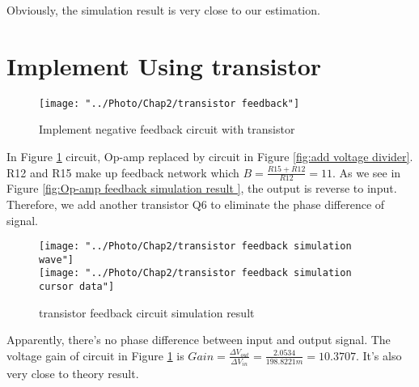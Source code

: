 Obviously, the simulation result is very close to our estimation.


\section{Implement Using transistor}


\begin{figure}[htbp]
\centering
\texttt{[image: "../Photo/Chap2/transistor feedback"]}
\caption{Implement negative feedback circuit with transistor}
\label{fig:transistorfeedback}
\end{figure}

In Figure \ref{fig:transistorfeedback} circuit, Op-amp replaced by circuit in Figure \ref{fig:add voltage divider}. R12 and R15 make up feedback network which $ B = \frac{R15+R12}{R12} = 11 $. As we see in Figure \ref{fig:Op-amp  feedback simulation result }, the output is reverse to input. Therefore, we add another transistor Q6 to eliminate the phase difference of signal.


\begin{figure}[htbp]
\centering
\texttt{[image: "../Photo/Chap2/transistor feedback simulation wave"]}\\[0.5cm]
\texttt{[image: "../Photo/Chap2/transistor feedback simulation cursor data"]}
\caption{transistor feedback circuit simulation result}
\label{fig:transistorfeedbacksimulationwave}
\end{figure}

Apparently, there's no phase difference between input and output signal. 
The voltage gain of circuit in Figure \ref{fig:transistorfeedback} is $ Gain = \frac{\Delta V_{out}}{\Delta V_{in}} = \frac{2.0534}{198.8221m} = 10.3707$. It's also very close to theory result.
 
 

